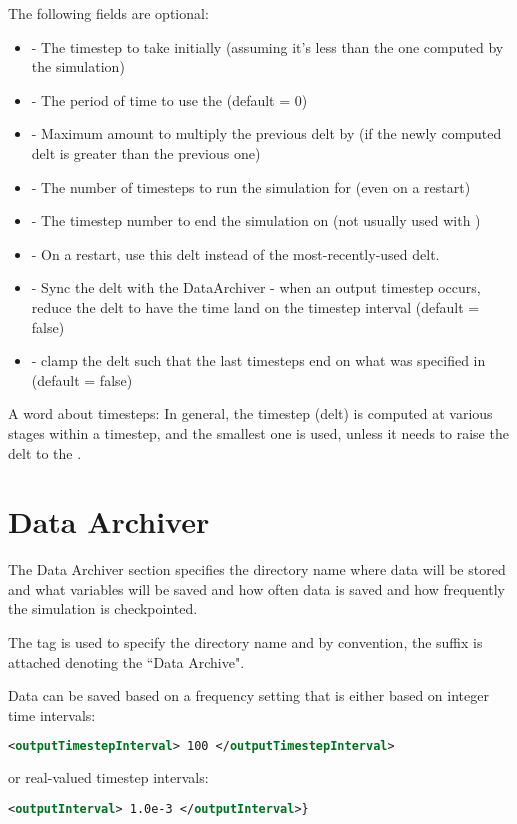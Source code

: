 The following fields are optional:
\begin{itemize}
\item {} - The timestep to take initially (assuming it's less than the one computed by the simulation)
\item {} - The period of time to use the  (default = 0)
\item {} - Maximum amount to multiply the previous delt by (if the newly computed delt is greater than the previous one)
\item {} - The number of timesteps to run the simulation for (even on a restart)
\item {} - The timestep number to end the simulation on (not usually used with )
\item {} - On a restart, use this delt instead of the most-recently-used delt.
\item {} - Sync the delt with the DataArchiver - when an output timestep occurs, reduce the delt to have the time land on the timestep interval (default = false)
\item {} - clamp the delt such that the last timesteps end on what was specified in  (default = false)
\end{itemize}
\begin{NoteBox}
A word about timesteps: In general, the timestep (delt) is computed at various stages within a timestep, and the smallest one is used, unless it needs to raise the delt to the .
\end{NoteBox}

\section{Data Archiver} \label{Sec:DataArchiver}
The Data Archiver section specifies the directory name where data will
be stored and what variables will be saved and how often data is saved
and how frequently the simulation is checkpointed.

The  tag is used to specify the directory
name and by convention, the  suffix is attached denoting the
``\Vaango Data Archive".

Data can be saved based on a frequency setting that is either based on integer time
intervals:
\begin{lstlisting}[language=XML]
  <outputTimestepInterval> 100 </outputTimestepInterval>
\end{lstlisting}
or real-valued timestep intervals:
\begin{lstlisting}[language=XML]
  <outputInterval> 1.0e-3 </outputInterval>}
\end{lstlisting}

